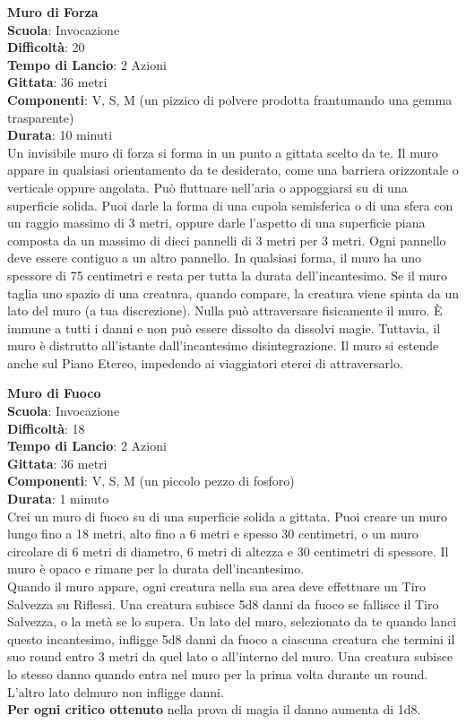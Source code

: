 \begin{multicols}{2}
\medskip\textbf{Muro di Forza}\\
\textbf{Scuola}: Invocazione\\
\textbf{Difficoltà}:  20\\
\textbf{Tempo di Lancio}: 2 Azioni\\
\textbf{Gittata}: 36 metri\\
\textbf{Componenti}: V, S, M (un pizzico di polvere prodotta frantumando una gemma trasparente)\\
\textbf{Durata}: 10 minuti\\
Un invisibile muro di forza si forma in un punto a gittata scelto da te. Il muro appare in qualsiasi orientamento da te desiderato, come una barriera orizzontale o verticale oppure angolata. Può fluttuare nell'aria o appoggiarsi su di una superficie solida. Puoi darle la forma di una cupola semisferica o di una sfera con un raggio massimo di 3 metri, oppure darle l’aspetto di una superficie piana composta da un massimo di dieci pannelli di 3 metri per 3 metri. Ogni pannello deve essere contiguo a un altro pannello. In qualsiasi forma, il muro ha uno spessore di 75 centimetri e resta per tutta la durata dell'incantesimo. Se il muro taglia uno spazio di una creatura, quando compare, la creatura viene spinta da un lato del muro (a tua discrezione). Nulla può attraversare fisicamente il muro. È immune a tutti i danni e non può essere dissolto da dissolvi magie. Tuttavia, il muro è distrutto all'istante dall'incantesimo disintegrazione. Il muro si estende anche sul Piano Etereo, impedendo ai viaggiatori eterei di attraversarlo.

\medskip\textbf{Muro di Fuoco}\\
\textbf{Scuola}: Invocazione\\
\textbf{Difficoltà}:  18\\
\textbf{Tempo di Lancio}: 2 Azioni\\
\textbf{Gittata}: 36 metri\\
\textbf{Componenti}: V, S, M (un piccolo pezzo di fosforo)\\
\textbf{Durata}: 1 minuto\\
Crei un muro di fuoco su di una superficie solida a gittata. Puoi creare un muro lungo fino a 18 metri, alto fino a 6 metri e spesso 30 centimetri, o un muro circolare di 6 metri di diametro, 6 metri di altezza e 30 centimetri di spessore. Il muro è opaco e rimane per la durata dell'incantesimo. \\
Quando il muro appare, ogni creatura nella sua area deve effettuare un Tiro Salvezza su Riflessi. Una creatura subisce 5d8 danni da fuoco se fallisce il Tiro Salvezza, o la metà se lo supera. Un lato del muro, selezionato da te quando lanci questo incantesimo, infligge 5d8 danni da fuoco a ciascuna creatura che termini il suo round entro 3 metri da quel lato o all'interno del muro. Una creatura subisce lo stesso danno quando entra nel muro per la prima volta durante un round. L’altro lato delmuro non infligge  danni.\\
\textbf{Per ogni critico ottenuto} nella prova di magia il danno aumenta di 1d8.


\end{multicols}
